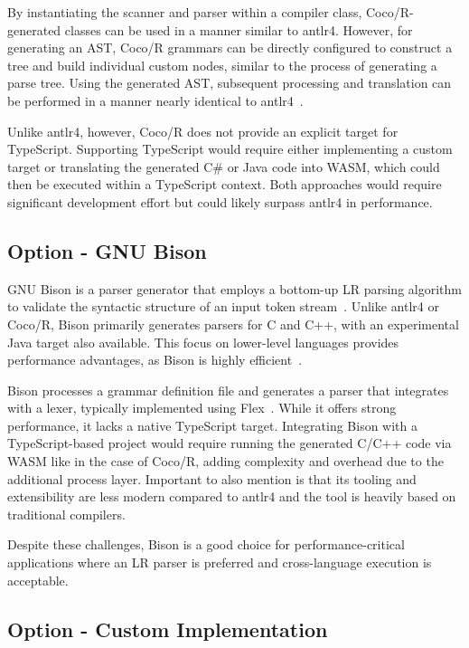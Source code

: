 By instantiating the scanner and parser within a compiler class, Coco/R-generated classes can be used in a manner similar to \Gls{antlr4}. However, for generating an AST, Coco/R grammars can be directly configured to construct a tree and build individual custom nodes, similar to the process of generating a parse tree. Using the generated AST, subsequent processing and translation can be performed in a manner nearly identical to \Gls{antlr4}~\cite{coco-ast}.

Unlike \Gls{antlr4}, however, Coco/R does not provide an explicit target for TypeScript. Supporting TypeScript would require either implementing a custom target or translating the generated C\# or Java code into WASM, which could then be executed within a TypeScript context. Both approaches would require significant development effort but could likely surpass \Gls{antlr4} in performance.

\subsection{Option - GNU Bison}
\label{sec:parser-technology-option-bison}

GNU Bison is a parser generator that employs a bottom-up LR parsing algorithm to validate the syntactic structure of an input token stream~\cite{bison}. Unlike \Gls{antlr4} or Coco/R, Bison primarily generates parsers for C and C++, with an experimental Java target also available. This focus on lower-level languages provides performance advantages, as Bison is highly efficient~\cite{bison-manual}.

Bison processes a grammar definition file and generates a parser that integrates with a lexer, typically implemented using Flex~\cite{flex}. While it offers strong performance, it lacks a native TypeScript target. Integrating Bison with a TypeScript-based project would require running the generated C/C++ code via WASM like in the case of Coco/R, adding complexity and overhead due to the additional process layer. Important to also mention is that its tooling and extensibility are less modern compared to \Gls{antlr4} and the tool is heavily based on traditional compilers.

Despite these challenges, Bison is a good choice for performance-critical applications where an LR parser is preferred and cross-language execution is acceptable.

\subsection{Option - Custom Implementation}
\label{sec:parser-technology-option-custom}


